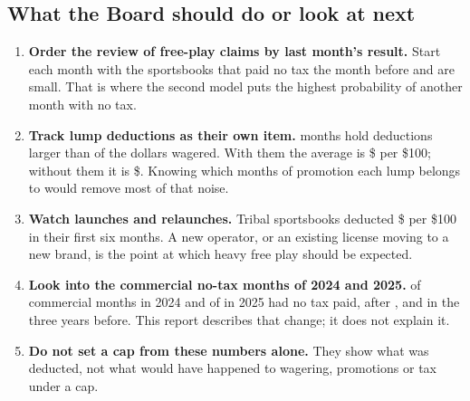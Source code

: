 \subsection*{What the Board should do or look at next}

\begin{enumerate}
\item \textbf{Order the review of free-play claims by last month's result.} Start each month with the sportsbooks that paid no tax the month before and are small. That is where the second model puts the highest probability of another month with no tax.
\item \textbf{Track lump deductions as their own item.}  months hold deductions larger than  of the dollars wagered. With them the average is \$ per \$100; without them it is \$. Knowing which months of promotion each lump belongs to would remove most of that noise.
\item \textbf{Watch launches and relaunches.} Tribal sportsbooks deducted \$ per \$100 in their first six months. A new operator, or an existing license moving to a new brand, is the point at which heavy free play should be expected.
\item \textbf{Look into the commercial no-tax months of 2024 and 2025.}  of  commercial months in 2024 and  of  in 2025 had no tax paid, after ,  and  in the three years before. This report describes that change; it does not explain it.
\item \textbf{Do not set a cap from these numbers alone.} They show what was deducted, not what would have happened to wagering, promotions or tax under a cap.
\end{enumerate}
